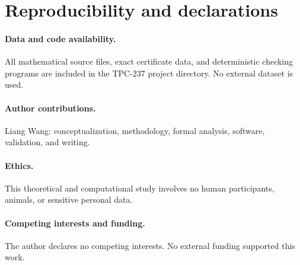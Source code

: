 \section*{Reproducibility and declarations}

\paragraph{Data and code availability.}
All mathematical source files, exact certificate data, and deterministic checking
programs are included in the TPC-237 project directory.  No external dataset is used.

\paragraph{Author contributions.}
Liang Wang: conceptualization, methodology, formal analysis, software, validation,
and writing.

\paragraph{Ethics.}
This theoretical and computational study involves no human participants, animals, or
sensitive personal data.

\paragraph{Competing interests and funding.}
The author declares no competing interests.  No external funding supported this work.

